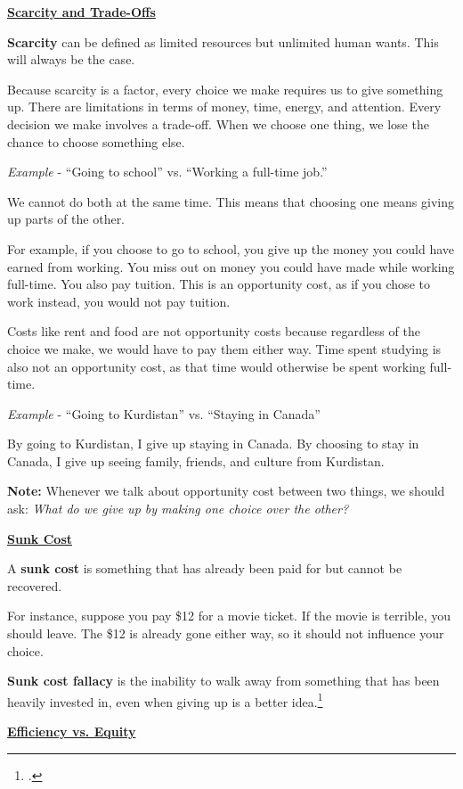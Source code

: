 \underline{\textbf{Scarcity and Trade-Offs}}

\textbf{Scarcity} can be defined as limited resources but unlimited human wants. This will always be the case.

Because scarcity is a factor, every choice we make requires us to give something up. There are limitations in terms of money, time, energy, and attention. Every decision we make involves a trade-off. When we choose one thing, we lose the chance to choose something else.

\textit{Example} - ``Going to school'' vs. ``Working a full-time job.''

We cannot do both at the same time. This means that choosing one means giving up parts of the other.

For example, if you choose to go to school, you give up the money you could have earned from working. You miss out on money you could have made while working full-time. You also pay tuition. This is an opportunity cost, as if you chose to work instead, you would not pay tuition.

Costs like rent and food are not opportunity costs because regardless of the choice we make, we would have to pay them either way. Time spent studying is also not an opportunity cost, as that time would otherwise be spent working full-time.

\textit{Example} - ``Going to Kurdistan'' vs. ``Staying in Canada''

By going to Kurdistan, I give up staying in Canada. By choosing to stay in Canada, I give up seeing family, friends, and culture from Kurdistan.

\textbf{Note:} Whenever we talk about opportunity cost between two things, we should ask: \textit{What do we give up by making one choice over the other?}

\underline{\textbf{Sunk Cost}}

A \textbf{sunk cost} is something that has already been paid for but cannot be recovered.

For instance, suppose you pay \$12 for a movie ticket. If the movie is terrible, you should leave. The \$12 is already gone either way, so it should not influence your choice.

\textbf{Sunk cost fallacy} is the inability to walk away from something that has been heavily invested in, even when giving up is a better idea.\footcite{decisionlab_sunkcost}

\underline{\textbf{Efficiency vs. Equity}}

